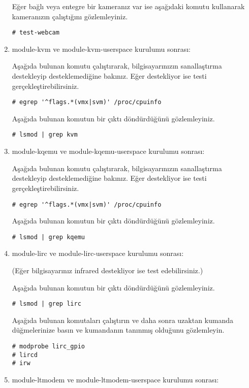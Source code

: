 \documentclass[a4paper,10pt]{article}
\begin{document}
\begin{enumerate}
Eğer bağlı veya entegre bir kameranız var ise aşağıdaki komutu kullanarak kameranızın çalıştığını gözlemleyiniz.
\begin{verbatim}
# test-webcam
\end{verbatim}

\item module-kvm ve module-kvm-userspace kurulumu sonrası:

Aşağıda bulunan komutu çalıştırarak, bilgisayarınızın sanallaştırma destekleyip desteklemediğine bakınız. Eğer destekliyor ise testi gerçekleştirebilirsiniz. 
\begin{verbatim}
# egrep '^flags.*(vmx|svm)' /proc/cpuinfo	
\end{verbatim}

Aşağıda bulunan komutun bir çıktı döndürdüğünü gözlemleyiniz.
\begin{verbatim}
# lsmod | grep kvm
\end{verbatim}

\item module-kqemu ve module-kqemu-userspace kurulumu sonrası:

Aşağıda bulunan komutu çalıştırarak, bilgisayarınızın sanallaştırma destekleyip desteklemediğine bakınız. Eğer destekliyor ise testi gerçekleştirebilirsiniz. 
\begin{verbatim}
# egrep '^flags.*(vmx|svm)' /proc/cpuinfo
\end{verbatim}

Aşağıda bulunan komutun bir çıktı döndürdüğünü gözlemleyiniz.
\begin{verbatim}
# lsmod | grep kqemu
\end{verbatim}

\item module-lirc ve module-lirc-userspace kurulumu sonrası:

(Eğer bilgisayarınız infrared destekliyor ise test edebilirsiniz.)

Aşağıda bulunan komutun bir çıktı döndürdüğünü gözlemleyiniz.
\begin{verbatim}
# lsmod | grep lirc
\end{verbatim}

Aşağıda bulunan komutaları çalıştırın ve daha sonra uzaktan kumanda düğmelerinize basın ve kumandanın tanınmış olduğunu gözlemleyin.
\begin{verbatim}
# modprobe lirc_gpio
# lircd
# irw  
\end{verbatim}
\item module-ltmodem ve module-ltmodem-userspace kurulumu sonrası:


\end{enumerate}
\end{document}
